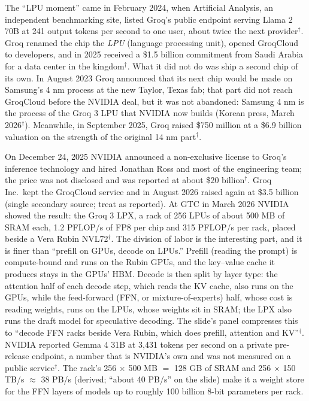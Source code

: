 \documentclass[11pt,letterpaper]{article}
\begin{document}
The ``LPU moment'' came in February 2024, when Artificial Analysis, an independent benchmarking site, listed Groq's public endpoint serving Llama 2 70B at 241 output tokens per second to one user, about twice the next provider$^\dagger$. Groq renamed the chip the \emph{LPU} (language processing unit), opened GroqCloud to developers, and in 2025 received a \$1.5 billion commitment from Saudi Arabia for a data center in the kingdom$^\dagger$. What it did not do was ship a second chip of its own. In August 2023 Groq announced that its next chip would be made on Samsung's 4 nm process at the new Taylor, Texas fab; that part did not reach GroqCloud before the NVIDIA deal, but it was not abandoned: Samsung 4 nm is the process of the Groq 3 LPU that NVIDIA now builds (Korean press, March 2026$^\dagger$). Meanwhile, in September 2025, Groq raised \$750 million at a \$6.9 billion valuation on the strength of the original 14 nm part$^\dagger$.

On December 24, 2025 NVIDIA announced a non-exclusive license to Groq's inference technology and hired Jonathan Ross and most of the engineering team; the price was not disclosed and was reported at about \$20 billion$^\dagger$. Groq Inc.\ kept the GroqCloud service and in August 2026 raised again at \$3.5 billion (single secondary source; treat as reported). At GTC in March 2026 NVIDIA showed the result: the Groq 3 LPX, a rack of 256 LPUs of about 500 MB of SRAM each, 1.2 PFLOP/s of FP8 per chip and 315 PFLOP/s per rack, placed beside a Vera Rubin NVL72$^\dagger$. The division of labor is the interesting part, and it is finer than ``prefill on GPUs, decode on LPUs.'' Prefill (reading the prompt) is compute-bound and runs on the Rubin GPUs, and the key--value cache it produces stays in the GPUs' HBM. Decode is then split by layer type: the attention half of each decode step, which reads the KV cache, also runs on the GPUs, while the feed-forward (FFN, or mixture-of-experts) half, whose cost is reading weights, runs on the LPUs, whose weights sit in SRAM; the LPX also runs the draft model for speculative decoding. The slide's panel compresses this to ``decode FFN racks beside Vera Rubin, which does prefill, attention and KV''$^\dagger$. NVIDIA reported Gemma 4 31B at 3{,}431 tokens per second on a private pre-release endpoint, a number that is NVIDIA's own and was not measured on a public service$^\dagger$. The rack's 256 $\times$ 500 MB $=$ 128 GB of SRAM and 256 $\times$ 150 TB/s $\approx$ 38 PB/s (derived; ``about 40 PB/s'' on the slide) make it a weight store for the FFN layers of models up to roughly 100 billion 8-bit parameters per rack.
\end{document}
